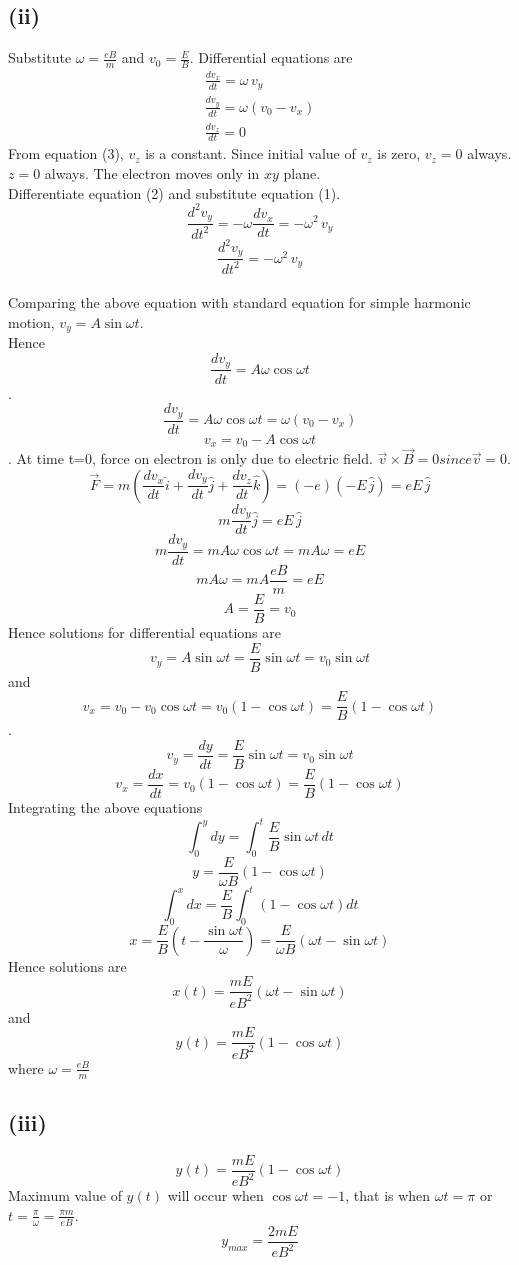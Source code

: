 \documentclass[12pt]{article}
\begin{document}
\subsection*{(ii)}
Substitute $\omega=\frac{eB}{m}$ and $v_0=\frac{E}{B}$.
Differential equations are 
\begin{align}
\frac{dv_x}{dt}=\omega\,v_y\\
\frac{dv_y}{dt}=\omega(v_0-v_x)\\
\frac{dv_z}{dt}=0
\end{align}
From equation (3),  $v_z$ is a constant. Since initial value of $v_z$ is zero, $v_z=0$ always.
$z=0$ always.
The electron moves only in $xy$ plane.\\
Differentiate equation (2) and substitute equation (1).
$$\frac{d^2v_y}{dt^2}=-\omega\frac{dv_x}{dt}=-\omega^2\,v_y$$
$$\frac{d^2v_y}{dt^2}=-\omega^2\,v_y$$\\
Comparing the above equation with standard equation for simple harmonic motion, $v_y=A\sin{\omega{t}}$.\\
Hence $$\frac{dv_y}{dt}=A\omega\cos{\omega{t}}$$.
$$\frac{dv_y}{dt}=A\omega\cos{\omega{t}}=\omega(v_0-v_x)$$
$$v_x=v_0-A\cos{\omega{t}}$$.
At time t=0, force on electron is only due to electric field. $\vec{v}\times\vec{B}=0 since \vec{v}=0.$
$$\vec{F}=m\left(\frac{dv_x}{dt}\hat{i}+\frac{dv_y}{dt}\hat{j}+\frac{dv_z}{dt}\hat{k} \right )=
(-e)(-E\,\hat{j})=eE\,\hat{j}$$
$$m\frac{dv_y}{dt}\hat{j}=eE\,\hat{j}$$
$$m\frac{dv_y}{dt}=mA\omega\cos{\omega{t}}=mA\omega=eE$$
$$mA\omega=mA\frac{eB}{m}=eE$$
$$A=\frac{E}{B}=v_0$$
Hence solutions for differential equations are $$v_y=A\sin{\omega{t}}=\frac{E}{B}\sin{\omega{t}}=v_0\sin{\omega{t}}$$ and $$v_x=v_0-v_0\cos{\omega{t}}=v_0(1-\cos{\omega{t}})=\frac{E}{B}(1-\cos{\omega{t}})$$.
$$v_y=\frac{dy}{dt}=\frac{E}{B}\sin{\omega{t}}=v_0\sin{\omega{t}}$$
$$v_x=\frac{dx}{dt}=v_0(1-\cos{\omega{t}})=\frac{E}{B}(1-\cos{\omega{t}})$$
Integrating the above equations
$$\int_{0}^{y}dy=\int_{0}^{t}\frac{E}{B}\sin{\omega{t}}\,dt$$
$$y=\frac{E}{\omega{B}}(1-\cos{\omega{t}})$$
$$\int_{0}^{x}dx=\frac{E}{B}\int_{0}^{t}(1-\cos{\omega{t}})dt$$
$$x=\frac{E}{B}\left(t-\frac{\sin{\omega{t}}}{\omega}\right)=\frac{E}{\omega{B}}\left(\omega{t}-\sin{\omega{t}}\right)$$
Hence solutions are $$\boxed{x(t)=\frac{mE}{eB^2}\left(\omega{t}-\sin{\omega{t}}\right)}$$ and 
\[\boxed{y(t)=\frac{mE}{eB^2}(1-\cos{\omega{t}})}\]
 where $\omega=\frac{eB}{m}$
\subsection*{(iii)}
\[y(t)=\frac{mE}{eB^2}(1-\cos{\omega{t}})\]
Maximum value of $y(t)$ will occur when $\cos{\omega{t}}=-1$, that is when $\omega{t}=\pi$ or $t=\frac{\pi}{\omega}=\frac{\pi{m}}{eB}$.
\[\boxed{y_{max}=\frac{2mE}{eB^2}}\]
\end{document}
